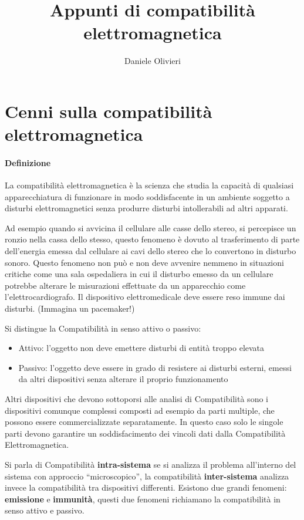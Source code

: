 \documentclass[a4paper,11pt]{scrartcl}
\title{Appunti di compatibilità elettromagnetica}
\author{Daniele Olivieri}
\date{}
\begin{document}
\maketitle

\section{Cenni sulla compatibilità elettromagnetica}
\paragraph{Definizione}
La compatibilità elettromagnetica è la scienza che studia la capacità di qualsiasi 
apparecchiatura di funzionare in modo soddisfacente in un ambiente soggetto a disturbi elettromagnetici
senza produrre disturbi intollerabili ad altri apparati.

Ad esempio quando si avvicina il cellulare alle casse dello stereo, si percepisce un ronzio nella cassa
dello stesso, questo fenomeno è dovuto al trasferimento di parte dell'energia emessa dal cellulare ai cavi 
dello stereo che lo convertono in disturbo sonoro.
Questo fenomeno non può e non deve avvenire nemmeno in situazioni critiche come una sala ospedaliera in cui il disturbo
emesso da un cellulare potrebbe alterare le misurazioni effettuate da un apparecchio come l'elettrocardiografo.
Il dispositivo elettromedicale deve essere reso immune dai disturbi. (Immagina un pacemaker!)

Si distingue la Compatibilità in senso attivo o passivo:
\begin{itemize}
 \item Attivo: l'oggetto non deve emettere disturbi di entità troppo elevata
 \item Passivo: l'oggetto deve essere in grado di resistere ai disturbi esterni, emessi da altri dispositivi
 senza alterare il proprio funzionamento
\end{itemize}

Altri dispositivi che devono sottoporsi alle analisi di Compatibilità sono i dispositivi comunque complessi
composti ad esempio da parti multiple, che possono essere commercializzate separatamente. In questo caso solo
le singole parti devono garantire un soddisfacimento dei vincoli dati dalla Compatibilità Elettromagnetica.

Si parla di Compatibilità \textbf{intra-sistema} se si analizza il problema all'interno del sistema con approccio
``microscopico'', la compatibilità \textbf{inter-sistema} analizza invece la compatibilità tra dispositivi differenti.
Esistono due grandi fenomeni: \textbf{emissione} e \textbf{immunità}, questi due fenomeni richiamano la compatibilità in senso attivo e passivo.
\end{document}
